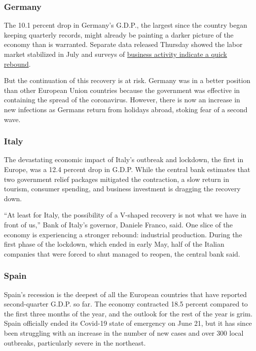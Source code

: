 \hypertarget{germany}{%
\subsubsection{Germany}\label{germany}}

The 10.1 percent drop in Germany's G.D.P., the largest since the country
began keeping quarterly records, might already be painting a darker
picture of the economy than is warranted. Separate data released
Thursday showed the labor market stabilized in July and surveys of
\href{https://www.nytimes.com/2020/07/30/business/a-fan-maker-explains-why-german-managers-are-upbeat.html}{business
activity indicate a quick rebound}.

But the continuation of this recovery is at risk. Germany was in a
better position than other European Union countries because the
government was effective in containing the spread of the coronavirus.
However, there is now an increase in new infections as Germans return
from holidays abroad, stoking fear of a second wave.

\hypertarget{italy}{%
\subsubsection{Italy}\label{italy}}

The devastating economic impact of Italy's outbreak and lockdown, the
first in Europe, was a 12.4 percent drop in G.D.P. While the central
bank estimates that two government relief packages mitigated the
contraction, a slow return in tourism, consumer spending, and business
investment is dragging the recovery down.

``At least for Italy, the possibility of a V-shaped recovery is not what
we have in front of us,'' Bank of Italy's governor, Daniele Franco,
said. One slice of the economy is experiencing a stronger rebound:
industrial production. During the first phase of the lockdown, which
ended in early May, half of the Italian companies that were forced to
shut managed to reopen, the central bank said.

\hypertarget{spain}{%
\subsubsection{Spain}\label{spain}}

Spain's recession is the deepest of all the European countries that have
reported second-quarter G.D.P. so far. The economy contracted 18.5
percent compared to the first three months of the year, and the outlook
for the rest of the year is grim. Spain officially ended its Covid-19
state of emergency on June 21, but it has since been struggling with an
increase in the number of new cases and over 300 local outbreaks,
particularly severe in the northeast.

